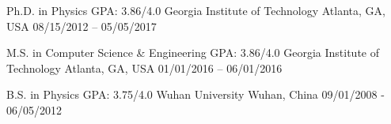 


\begin{cventries}

\cveducation
{Ph.D. in Physics}
{GPA: 3.86/4.0}
{Georgia Institute of Technology}
{Atlanta, GA, USA}
{08/15/2012 -- 05/05/2017}
{
}
\vspace{-0.5em}

\cveducation
{M.S. in Computer Science \& Engineering }
{GPA: 3.86/4.0}
{Georgia Institute of Technology}
{Atlanta, GA, USA}
{01/01/2016 -- 06/01/2016}
{
}
\vspace{-0.5em}

\cveducation
{B.S. in Physics} %
{GPA: 3.75/4.0}
{Wuhan University} %
{Wuhan, China} %
{09/01/2008 - 06/05/2012}
{
}
\vspace{-0.5em}



\end{cventries}
